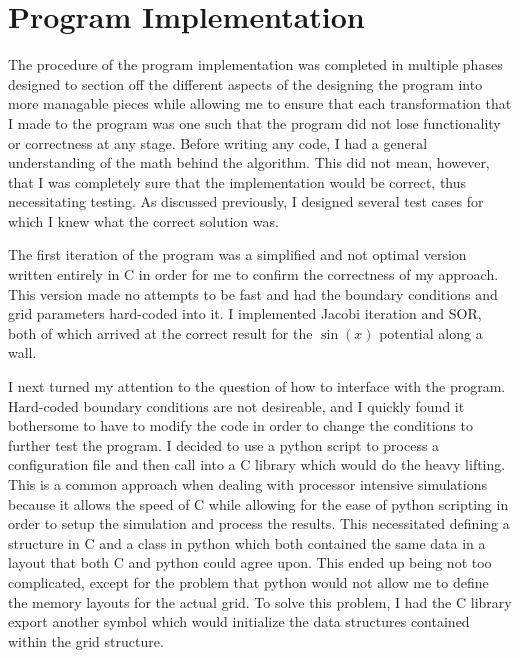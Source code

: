 \section{Program Implementation}
\label{app:des}
The procedure of the program implementation was completed in multiple phases designed to section off
the different aspects of the designing the program into more managable pieces while allowing me to ensure
that each transformation that I made to the program was one such that the program did not lose functionality
or correctness at any stage. Before writing any code, I had a general understanding of the math behind the
algorithm. This did not mean, however, that I was completely sure that the implementation would be correct,
thus necessitating testing. As discussed previously, I designed several test cases for which I knew what the
correct solution was.

The first iteration of the program was a simplified and not optimal version written entirely
in C in order for me to confirm the correctness of my approach. This version made no attempts to
be fast and had the boundary conditions and grid parameters hard-coded into it. I implemented
Jacobi iteration and SOR, both of which arrived at the correct result for the $\sin(x)$ potential
along a wall.

I next turned my attention to the question of how to interface with the program. Hard-coded boundary conditions
are not desireable, and I quickly found it bothersome to have to modify the code in order to change the conditions
to further test the program. I decided to use a python script to process a configuration file and then call into a
C library which would do the heavy lifting. This is a common approach when dealing with processor intensive simulations
because it allows the speed of C while allowing for the ease of python scripting in order to setup the simulation and
process the results. This necessitated defining a structure in C and a class in python which both contained the same
data in a layout that both C and python could agree upon. This ended up being not too complicated, except for the problem
that python would not allow me to define the memory layouts for the actual grid. To solve this problem, I had the C library
export another symbol which would initialize the data structures contained within the grid structure.

